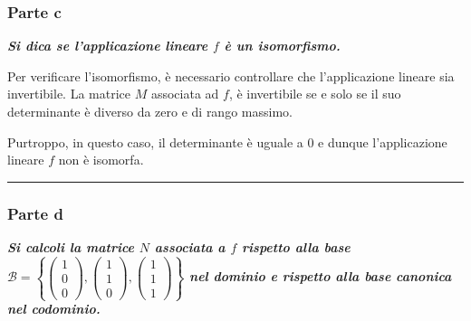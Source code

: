 \documentclass[a4paper]{article}
\newcommand{\longline}{\noindent\rule{\textwidth}{0.4pt}}
\begin{document}
	\newpage
	\subsubsection{Parte c}

	\textcolor{Green4}{\textbf{\emph{Si dica se l'applicazione lineare $f$ è un isomorfismo.}}}\newline

	\noindent
	Per verificare l'isomorfismo, è necessario controllare che l'applicazione lineare sia invertibile. La matrice $M$ associata ad $f$, è invertibile se e solo se il suo determinante è diverso da zero e di rango massimo.

	Purtroppo, in questo caso, il determinante è uguale a 0 e dunque l'applicazione lineare $f$ non è isomorfa.

	\longline

	\subsubsection{Parte d}

	\textcolor{Green4}{\textbf{\emph{Si calcoli la matrice $N$ associata a $f$ rispetto alla base $\mathcal{B} = \left\{\begin{pmatrix}
		1 \\ 0 \\ 0
	\end{pmatrix},\begin{pmatrix}
		1 \\ 1 \\ 0
	\end{pmatrix},\begin{pmatrix}
		1 \\ 1 \\ 1
	\end{pmatrix}\right\}$ nel dominio e rispetto alla base canonica nel codominio.}}}\newline
\end{document}
